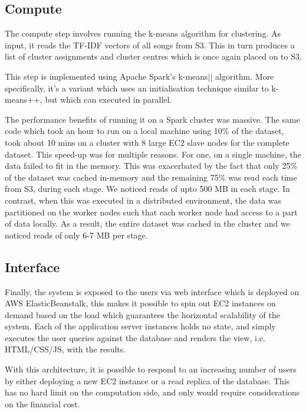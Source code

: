 \documentclass[10pt,a4paper]{scrartcl}
\begin{document}
  \subsection{Compute}
 
  The compute step involves running the k-means algorithm for clustering.
  As input, it reads the TF-IDF vectors of all songs from S3.
  This in turn produces a list of cluster assignments and cluster centres which is 
  once again placed on to S3.
  
  This step is implemented using Apache Spark's k-means$||$ algorithm.
  More specifically, it's a variant which uses an initialisation technique similar to k-means++,
  but which can executed in parallel.
  
  The performance benefits of running it on a Spark cluster was massive.
  The same code which took an hour to run on a local machine using 10\% of the dataset,
  took about 10 mins on a cluster with 8 large EC2 slave nodes for the complete dataset.
  This speed-up was for multiple reasons.
  For one, on a single machine, the data failed to fit in the memory.
  This was exacerbated by the fact that only 25\% of the dataset was cached in-memory and
  the remaining 75\% was read each time from S3, during each stage.
  We noticed reads of upto 500 MB in each stage.
  In contrast, when this was executed in a distributed environment, the data was partitioned on
  the worker nodes such that each worker node had access to a part of data locally.
  As a result, the entire dataset was cached in the cluster and we noticed reads of only
  6-7 MB per stage.
  
  \subsection{Interface}
  
  Finally, the system is exposed to the users via web interface which is deployed
  on AWS ElasticBeanstalk, this makes it possible to spin out EC2 instances on
  demand based on the load which guarantees the horizontal scalability of
  the system. Each of the application server instances holds no state, and simply
  executes the user queries against the database and renders the view, i.e.
  HTML/CSS/JS, with the results.
  
  With this architecture, it is possible to respond to an increasing number of
  users by either deploying a new EC2 instance or a read replica of the
  database. This has no hard limit on the computation side, and only
  would require considerations on the financial cost.
  
\end{document}
